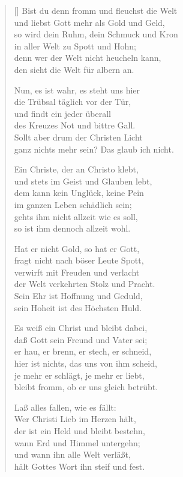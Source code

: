 \begin{multicols}{2}
\begin{verse}[\versewidth]
 Bist du denn fromm und fleuchst die Welt\\
und liebst Gott mehr als Gold und Geld,\\
so wird dein Ruhm, dein Schmuck und Kron\\
in aller Welt zu Spott und Hohn;\\
denn wer der Welt nicht heucheln kann,\\
den sieht die Welt für albern an.

 Nun, es ist wahr, es steht uns hier\\
die Trübsal täglich vor der Tür,\\
und findt ein jeder überall\\
des Kreuzes Not und bittre Gall.\\
Sollt aber drum der Christen Licht\\
ganz nichts mehr sein? Das glaub ich nicht.

 Ein Christe, der an Christo klebt,\\
und stets im Geist und Glauben lebt,\\
dem kann kein Unglück, keine Pein\\
im ganzen Leben schädlich sein;\\
gehts ihm nicht allzeit wie es soll,\\
so ist ihm dennoch allzeit wohl.

 Hat er nicht Gold, so hat er Gott,\\
fragt nicht nach böser Leute Spott,\\
verwirft mit Freuden und verlacht\\
der Welt verkehrten Stolz und Pracht.\\
Sein Ehr ist Hoffnung und Geduld,\\
sein Hoheit ist des Höchsten Huld.

 Es weiß ein Christ und bleibt dabei,\\
daß Gott sein Freund und Vater sei;\\
er hau, er brenn, er stech, er schneid,\\
hier ist nichts, das uns von ihm scheid,\\
je mehr er schlägt, je mehr er liebt,\\
bleibt fromm, ob er uns gleich betrübt.

 Laß alles fallen, wie es fällt:\\
Wer Christi Lieb im Herzen hält,\\
der ist ein Held und bleibt bestehn,\\
wann Erd und Himmel untergehn;\\
und wann ihn alle Welt verläßt,\\
hält Gottes Wort ihn steif und fest.


\end{verse}
\end{multicols}
